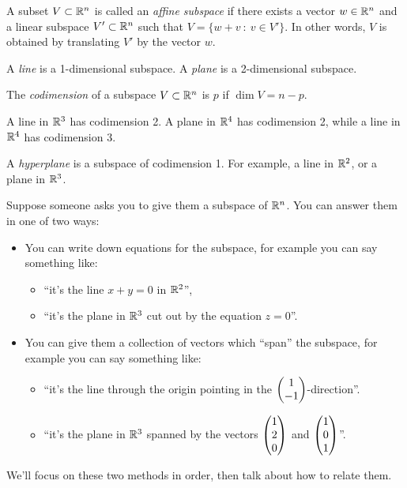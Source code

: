 \documentclass{article}
\begin{document}
\begin{Definition}\label{dfn:affinesubspace}
A subset \(V\subset\mathbb{R}^n\) is called an {\em affine subspace} if
there exists a vector \(w\in\mathbb{R}^n\) and a linear subspace
\(V'\subset\mathbb{R}^n\) such that \(V=\{w+v\ :\ v\in V'\}\). In other
words, \(V\) is obtained by translating \(V'\) by the vector \(w\).


\end{Definition}
\begin{Remark}
A {\em line} is a 1-dimensional subspace. A {\em plane} is a
2-dimensional subspace.


\end{Remark}
\begin{Definition}[Codimension]\label{dfn:codimension}
The {\em codimension} of a subspace \(V\subset\mathbb{R}^n\) is \(p\) if
\(\dim V=n-p\).


\end{Definition}
\begin{Example}
A line in \(\mathbb{R}^3\) has codimension 2. A plane in \(\mathbb{R}^4\) has
codimension 2, while a line in \(\mathbb{R}^4\) has codimension 3.


\end{Example}
\begin{Definition}
A {\em hyperplane} is a subspace of codimension 1. For example, a
line in \(\mathbb{R}^2\), or a plane in \(\mathbb{R}^3\).


\end{Definition}
Suppose someone asks you to give them a subspace of \(\mathbb{R}^n\). You can
answer them in one of two ways:
\begin{itemize}
\item You can write down equations for the subspace, for example you can
say something like:
\begin{itemize}
\item ``it's the line \(x+y=0\) in \(\mathbb{R}^2\)'',
\item ``it's the plane in \(\mathbb{R}^3\) cut out by the equation \(z=0\)''.
\end{itemize}
\item You can give them a collection of vectors which ``span'' the
subspace, for example you can say something like:
\begin{itemize}
\item ``it's the line through the origin pointing in the \(\begin{pmatrix} 1 \\ -1\end{pmatrix}\)-direction''.
\item ``it's the plane in \(\mathbb{R}^3\) spanned by the vectors \(\begin{pmatrix} 1 \\ 2 \\ 0\end{pmatrix}\) and \(\begin{pmatrix} 1 \\ 0 \\ 1\end{pmatrix}\)''.
\end{itemize}
\end{itemize}
We'll focus on these two methods in order, then talk about how to
relate them.
\end{document}
